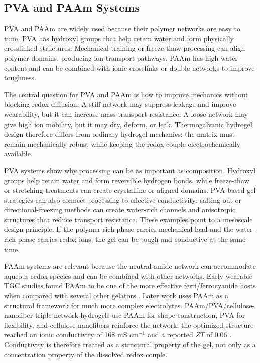\documentclass[a4paper,12pt]{report}
\begin{document}
\subsection{PVA and PAAm Systems}

PVA and PAAm are widely used because their polymer networks are easy to tune.
PVA has hydroxyl groups that help retain water and form physically crosslinked
structures. Mechanical training or freeze-thaw processing can align polymer
domains, producing ion-transport pathways. PAAm has high water content and can
be combined with ionic crosslinks or double networks to improve toughness.

The central question for PVA and PAAm is how to improve mechanics without
blocking redox diffusion. A stiff network may suppress leakage and improve
wearability, but it can increase mass-transport resistance. A loose network may
give high ion mobility, but it may dry, deform, or leak. Thermogalvanic hydrogel
design therefore differs from ordinary hydrogel mechanics: the matrix must
remain mechanically robust while keeping the redox couple electrochemically
available.

PVA systems show why processing can be as important as composition. Hydroxyl
groups help retain water and form reversible hydrogen bonds, while freeze-thaw
or stretching treatments can create crystalline or aligned domains. PVA-based
gel strategies can also connect processing to effective conductivity:
salting-out or directional-freezing
methods can create water-rich channels and anisotropic structures that reduce
transport resistance. These examples point to a
mesoscale design principle. If the polymer-rich phase carries mechanical load
and the water-rich phase carries redox ions, the gel can be tough and conductive
at the same time.

PAAm systems are relevant because the neutral amide network can accommodate
aqueous redox species and can be combined with other networks. Early wearable
TGC studies found PAAm to be one of the more effective ferri/ferrocyanide hosts
when compared with several other gelators \citep{russo2019hydrogels}. Later work
uses PAAm as a structural framework for much more complex electrolytes.
PAAm/PVA/cellulose-nanofiber triple-network hydrogels use
PAAm for shape construction, PVA for flexibility, and cellulose
nanofibers reinforce the network; the optimized structure reached an ionic
conductivity of 168 mS cm$^{-1}$ and a reported $ZT$ of 0.06
\citep{lin2024triple}. Conductivity is therefore treated as a structural
property of the gel, not only as a concentration
property of the dissolved redox couple.
\end{document}
